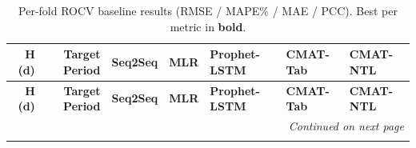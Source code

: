 \begin{longtable}{r r l l l l l}
\caption{Per-fold ROCV baseline results (RMSE / MAPE\% / MAE / PCC). Best per metric in \textbf{bold}.}
\label{tab:baseline_full_results} \\

\toprule
\textbf{H (d)} & \textbf{Target Period} & \textbf{Seq2Seq} & \textbf{MLR} & \textbf{Prophet-LSTM} & \textbf{CMAT-Tab} & \textbf{CMAT-NTL} \\
\midrule
\endfirsthead

\toprule
\textbf{H (d)} & \textbf{Target Period} & \textbf{Seq2Seq} & \textbf{MLR} & \textbf{Prophet-LSTM} & \textbf{CMAT-Tab} & \textbf{CMAT-NTL} \\
\midrule
\endhead

\midrule
\multicolumn{7}{r}{\textit{Continued on next page}} \\
\endfoot

\bottomrule
\endlastfoot


\end{longtable}
